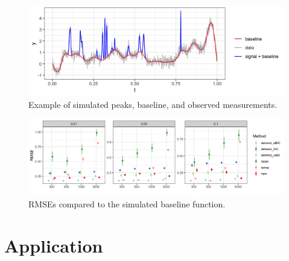 \documentclass[]{article}
\begin{document}
\begin{figure}
	\caption{Example of simulated peaks, baseline, and observed measurements.}
	\includegraphics[width = \linewidth]{Figures/ex_peaks.png}
\end{figure}



\begin{figure}[h!]
	\caption{RMSEs compared to the simulated baseline function.}
	\includegraphics[width = \linewidth]{Figures/peaks_mse.png}
\end{figure}



\section{Application}
\end{document}
